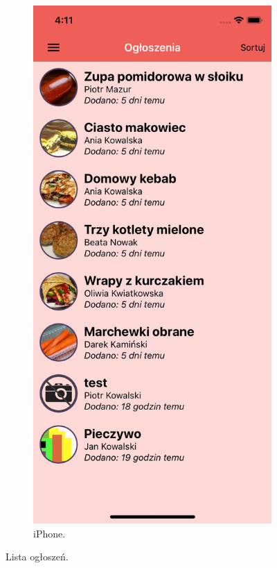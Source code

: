 \documentclass[licencjacka]{pracamgr}
\begin{document}
\begin{figure}[h!]
\begin{subfigure}[b]{0.4\linewidth}
    \includegraphics[width=\linewidth]{ios1.jpg}
    \caption{iPhone.}
  \end{subfigure}
  \caption{Lista ogłoszeń.}
  \label{fig:offers}
\end{figure}
\end{document}
